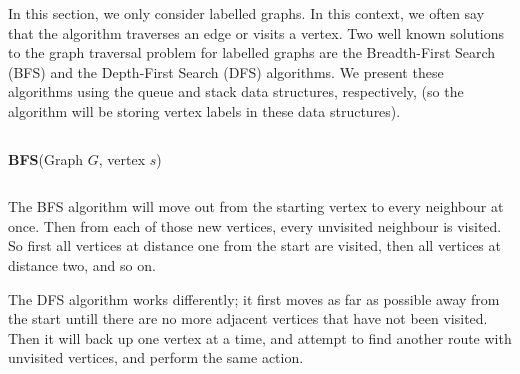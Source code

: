 \documentclass[12pt,letterpaper,oneside]{book}
\begin{document}
In this section, we only consider labelled graphs.  In this context, we often say that 
the algorithm traverses an edge or visits a vertex.  
Two well known solutions to the graph traversal problem for labelled graphs are the Breadth-First 
Search (BFS) and the Depth-First Search (DFS) algorithms.  We present these algorithms using the queue and stack 
data structures, respectively, (so the algorithm will be storing vertex labels in these data structures).  

\begin{center}\begin{tabular*}{\textwidth}{c}\hline\end{tabular*}\end{center}
\noindent \textbf{BFS}(Graph $G$, vertex $s$)
\begin{algorithmic}[1] 
    \ENDIF
  \ENDWHILE

\end{algorithmic}
\begin{center}\begin{tabular*}{\textwidth}{c}\hline\end{tabular*}\end{center}


The BFS algorithm will move out from the starting vertex to every neighbour at once.  Then from each of those new vertices, every 
unvisited neighbour is visited.  So first all vertices at distance one from the start are visited, then all vertices at 
distance two, and so on. 

The DFS algorithm works differently; it first moves as far as possible away from the start untill there are no more adjacent vertices that 
have not been visited.  Then it will back up one vertex at a time, and attempt to find another route with unvisited vertices, and perform 
the same action.  
\end{document}
